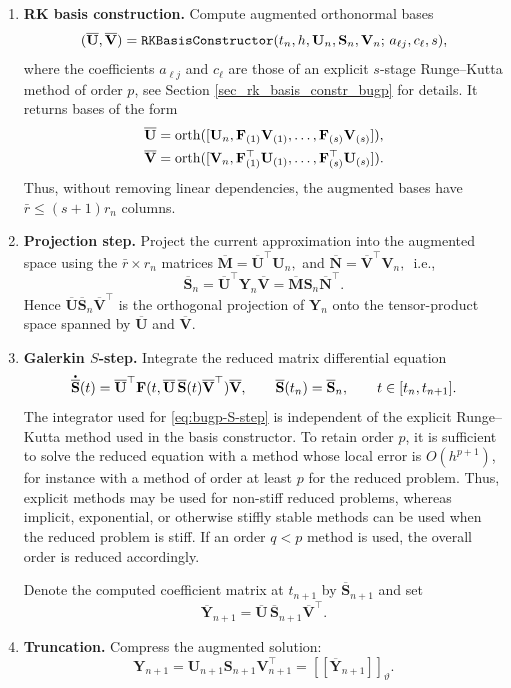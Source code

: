 \documentclass[preprint,runningheads]{svjour3}
\newcommand*{\dt}[1]{ \accentset{\mbox{\large\bfseries .}}{#1}}
\def\wt{\widetilde}
\def\wt{\overline}
\newcommand\bfF{{\mathbf F}}
\newcommand\bfM{{\mathbf M}}
\newcommand\bfN{{\mathbf N}}
\newcommand\bfS{{\mathbf S}}
\newcommand\bfU{{\mathbf U}}
\newcommand\bfV{{\mathbf V}}
\newcommand\bfY{{\mathbf Y}}
\begin{document}
\begin{enumerate}
\item {\bf RK basis construction.}
Compute augmented orthonormal bases
\[
    (\wt\bfU,\wt\bfV)
    =
    {\tt RKBasisConstructor}
    (t_n,h,\bfU_n,\bfS_n,\bfV_n;\,a_{\ell j},c_\ell,s),
\]
where the coefficients $a_{\ell j}$ and $c_\ell$ are those of an explicit
$s$-stage Runge--Kutta method of order $p$, see Section \ref{sec_rk_basis_constr_bugp} for details.
It returns bases of the form
\[
\begin{aligned}
    \wt\bfU
    &=
    {\rm orth}
    ([\bfU_n,\bfF_{(1)}\bfV_{(1)},\ldots,\bfF_{(s)}\bfV_{(s)}]), \\
    \wt\bfV
    &=
    {\rm orth}
    ([\bfV_n,\bfF_{(1)}^\top\bfU_{(1)},\ldots,
      \bfF_{(s)}^\top\bfU_{(s)}]).
\end{aligned}
\]
Thus, without removing linear dependencies, the augmented bases have 
$\bar{r}\leq (s+1)r_n$ columns.  

\item {\bf Projection step.}
Project the current approximation into the augmented space using the $\bar{r}\times r_n$ matrices
$
    \wt\bfM=\wt\bfU^\top\bfU_n,
$
and
$
    \wt\bfN=\wt\bfV^\top\bfV_n,
$
\,i.e.,
\[
    \wt\bfS_n
    =
    \wt\bfU^\top\bfY_n\wt\bfV
    =
    \wt\bfM\bfS_n\wt\bfN^\top .
\]
Hence $\wt\bfU\wt\bfS_n\wt\bfV^\top$ is the orthogonal projection of
$\bfY_n$ onto the tensor-product space spanned by $\wt\bfU$ and $\wt\bfV$.

\item {\bf Galerkin $S$-step.}
Integrate the reduced matrix differential equation
\begin{equation}
\label{eq:bugp-S-step}
    \dt{\wt\bfS}(t)
    =
    \wt\bfU^\top
    \bfF(t,\wt\bfU\,\wt\bfS(t)\wt\bfV^\top)
    \wt\bfV,
    \qquad
    \wt\bfS(t_n)=\wt\bfS_n,
    \qquad
    t\in[t_n,t_{n+1}].
\end{equation}
The integrator used for \eqref{eq:bugp-S-step} is independent of the explicit
Runge--Kutta method used in the basis constructor. To retain order $p$, it is
sufficient to solve the reduced equation with a method whose local error is
$O(h^{p+1})$, for instance with a method of order at least $p$ for the reduced
problem. Thus, explicit methods may be used for non-stiff reduced problems,
whereas implicit, exponential, or otherwise stiffly stable methods can be used
when the reduced problem is stiff. If an order $q<p$ method is used, the overall
order is reduced accordingly.

Denote the computed coefficient matrix at $t_{n+1}$ by $\wt\bfS_{n+1}$ and set
\[
    \wt\bfY_{n+1}
    =
    \wt\bfU\,\wt\bfS_{n+1}\wt\bfV^\top .
\]

\item {\bf Truncation.}
Compress the augmented solution:
\[
    \bfY_{n+1}
    =
    \bfU_{n+1}\bfS_{n+1}\bfV_{n+1}^\top
    =
    [\![\wt\bfY_{n+1}]\!]_{\vartheta}.
\]
\end{enumerate}
\end{document}
